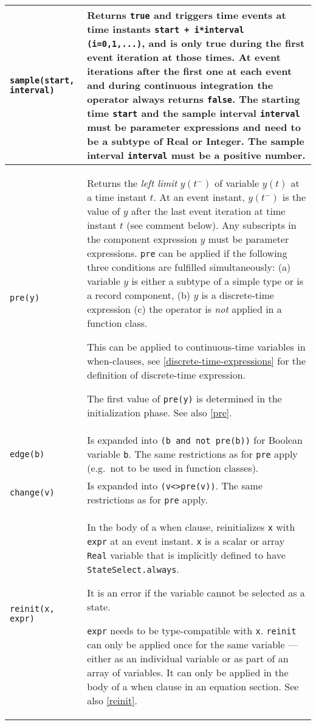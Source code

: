 \begin{longtable}{|p{5cm}|p{8cm}|}
\lstinline!sample(start, interval)! & Returns \lstinline!true! and triggers time events at time
instants \lstinline!start + i*interval (i=0,1,...)!, and is only true during the first event iteration at those times.
At event iterations after the first one at each event and during continuous integration
the operator always returns \lstinline!false!. The starting time \lstinline!start! and the
sample interval \lstinline!interval! must be parameter expressions and need to be
a subtype of Real or Integer. The sample interval \lstinline!interval! must be a
positive number.\\ \hline

\lstinline!pre(y)! & Returns the \emph{left limit} $y(t^{-})$ of
variable $y(t)$ at a time instant $t$.  At an event instant,
$y(t^{-})$ is the value of $y$ after the last event
iteration at time instant $t$ (see comment below).
Any subscripts in the component expression $y$ must be parameter expressions.
\lstinline!pre! can be applied if the following three conditions are fulfilled
simultaneously: (a) variable $y$ is either a subtype of a simple type or
is a record component, (b) $y$ is a discrete-time expression (c) the
operator is \emph{not} applied in a function class.
\begin{nonnormative}
This can be applied to continuous-time variables in when-clauses, see \autoref{discrete-time-expressions} for the definition of discrete-time expression.
\end{nonnormative}
The first value of \lstinline!pre(y)! is determined in the initialization phase. See
also \autoref{pre}.\\ \hline

\lstinline!edge(b)! & Is expanded into \lstinline!(b and not pre(b))! for Boolean variable
\lstinline!b!. The same restrictions as for \lstinline!pre! apply (e.g.\ not to be
used in function classes).\\ \hline

\lstinline!change(v)! & Is expanded into \lstinline!(v<>pre(v))!. The same restrictions as for \lstinline!pre! apply.\\ \hline

\lstinline!reinit(x, expr)! & In the body of a when clause, reinitializes \lstinline!x! with
\lstinline!expr! at an event instant. \lstinline!x! is a scalar or array \lstinline!Real! variable that is implicitly defined to have \lstinline!StateSelect.always!.
\begin{nonnormative}
It is an error if the variable cannot be selected as a state.
\end{nonnormative}
\lstinline!expr! needs to be type-compatible with \lstinline!x!.
\lstinline!reinit! can only be applied once for the same variable --- either
as an individual variable or as part of an array of variables. It can
only be applied in the body of a when clause in an equation section. See
also \autoref{reinit}.\\ \hline
\end{longtable}

